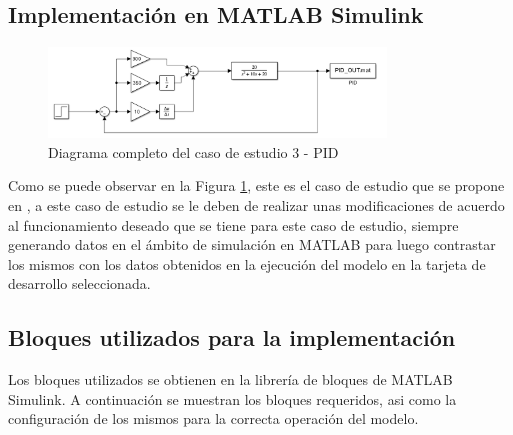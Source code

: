 \subsection{Implementación en MATLAB Simulink}

\begin{figure}[h!]
    \centering
    \includegraphics[width=0.8\textwidth]{fig/Capitulo5/Caso_de_estudio_PID/PID_Diagram.png}
    \caption{Diagrama completo del caso de estudio 3 - PID }
    \label{fig:caso_de_estudio_3_PID}
\end{figure}


Como se puede observar en la Figura \ref{fig:caso_de_estudio_3_PID}, este es el caso de estudio que se propone en \cite{microcontrollerslab_pid_controller_design}, a este caso de estudio se le deben de realizar unas modificaciones de acuerdo al funcionamiento deseado que se tiene para este caso de estudio, siempre generando datos en el ámbito de simulación en MATLAB para luego contrastar los mismos con los datos obtenidos en la ejecución del modelo en la tarjeta de desarrollo seleccionada.

\subsection{Bloques utilizados para la implementación}

Los bloques utilizados se obtienen en la librería de bloques de MATLAB Simulink. A continuación se muestran los bloques requeridos, asi como la configuración de los mismos para la correcta operación del modelo.

